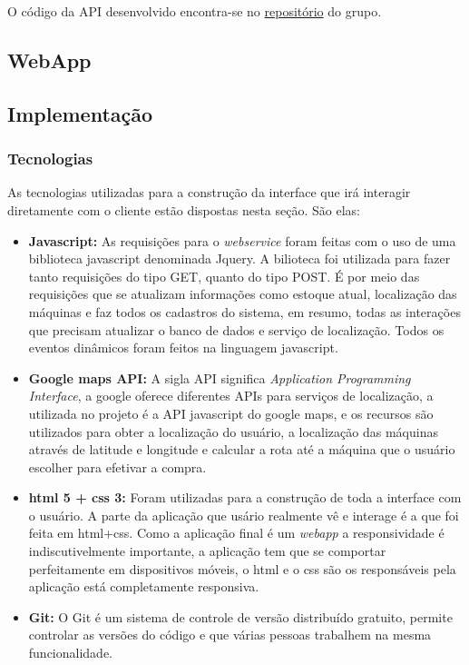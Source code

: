 O código da API desenvolvido encontra-se no \href{http://github.com/pi2-picole/api}{repositório} do grupo.


\subsection{WebApp}
\subsection{Implementação}

\subsubsection{Tecnologias}

As tecnologias utilizadas para a construção da interface que irá interagir diretamente com o cliente estão dispostas nesta seção. São elas:

\begin{itemize}
\item \textbf{Javascript:} As requisições para o \textit{webservice} foram feitas com o uso de uma biblioteca javascript denominada Jquery. A bilioteca foi utilizada para fazer tanto requisições do tipo GET, quanto do tipo POST. É por meio das requisições que se atualizam informações como estoque atual, localização das máquinas e faz todos os cadastros do sistema, em resumo, todas as interações que precisam atualizar o banco de dados e serviço de localização. Todos os eventos dinâmicos foram feitos na linguagem javascript.
\item \textbf{Google maps API:} A sigla API significa \textit{Application Programming Interface}, a google oferece diferentes APIs para serviços de localização, a utilizada no projeto é a API javascript do google maps, e os recursos são utilizados para obter a localização do usuário, a localização das máquinas através de latitude e longitude e calcular a rota até a máquina que o usuário escolher para efetivar a compra.
\item\textbf{ html 5 + css 3:} Foram utilizadas para a construção de toda a interface com o usuário. A parte da aplicação que usário realmente vê e interage é a que foi feita em html+css. Como a aplicação final é um \textit{webapp} a responsividade é indiscutivelmente importante, a aplicação tem que se comportar perfeitamente em dispositivos móveis, o html e o css são os responsáveis pela aplicação está completamente responsiva.
\item\textbf{Git:} O Git é um sistema de controle de versão distribuído gratuito, permite controlar as versões do código e que várias pessoas trabalhem na mesma funcionalidade.
\end{itemize}


